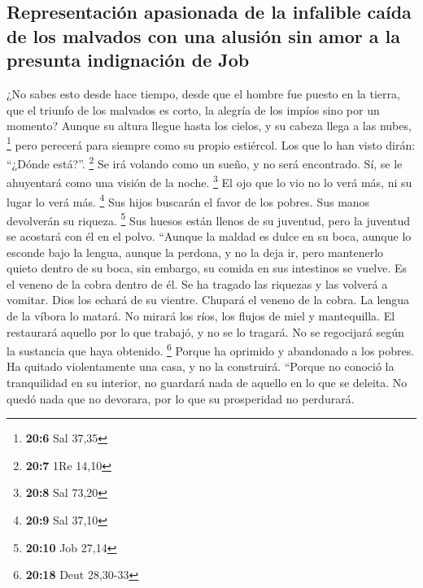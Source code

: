 \hypertarget{representaciuxf3n-apasionada-de-la-infalible-cauxedda-de-los-malvados-con-una-alusiuxf3n-sin-amor-a-la-presunta-indignaciuxf3n-de-job}{%
\subsection{Representación apasionada de la infalible caída de los
malvados con una alusión sin amor a la presunta indignación de
Job}\label{representaciuxf3n-apasionada-de-la-infalible-cauxedda-de-los-malvados-con-una-alusiuxf3n-sin-amor-a-la-presunta-indignaciuxf3n-de-job}}

 ¿No sabes esto desde hace tiempo, desde que el hombre fue
puesto en la tierra,  que el triunfo de los malvados es
corto, la alegría de los impíos sino por un momento? 
Aunque su altura llegue hasta los cielos, y su cabeza llega a las nubes,
\footnote{\textbf{20:6} Sal 37,35}  pero perecerá para
siempre como su propio estiércol. Los que lo han visto dirán: ``¿Dónde
está?''. \footnote{\textbf{20:7} 1Re 14,10}  Se irá
volando como un sueño, y no será encontrado. Sí, se le ahuyentará como
una visión de la noche. \footnote{\textbf{20:8} Sal 73,20}
 El ojo que lo vio no lo verá más, ni su lugar lo verá
más. \footnote{\textbf{20:9} Sal 37,10}  Sus hijos
buscarán el favor de los pobres. Sus manos devolverán su riqueza.
\footnote{\textbf{20:10} Job 27,14}  Sus huesos están
llenos de su juventud, pero la juventud se acostará con él en el polvo.
 ``Aunque la maldad es dulce en su boca, aunque lo
esconde bajo la lengua,  aunque la perdona, y no la deja
ir, pero mantenerlo quieto dentro de su boca,  sin
embargo, su comida en sus intestinos se vuelve. Es el veneno de la cobra
dentro de él.  Se ha tragado las riquezas y las volverá a
vomitar. Dios los echará de su vientre.  Chupará el
veneno de la cobra. La lengua de la víbora lo matará.  No
mirará los ríos, los flujos de miel y mantequilla.  El
restaurará aquello por lo que trabajó, y no se lo tragará. No se
regocijará según la sustancia que haya obtenido. \footnote{\textbf{20:18}
  Deut 28,30-33}  Porque ha oprimido y abandonado a los
pobres. Ha quitado violentamente una casa, y no la construirá.
 ``Porque no conoció la tranquilidad en su interior, no
guardará nada de aquello en lo que se deleita.  No quedó
nada que no devorara, por lo que su prosperidad no perdurará.
